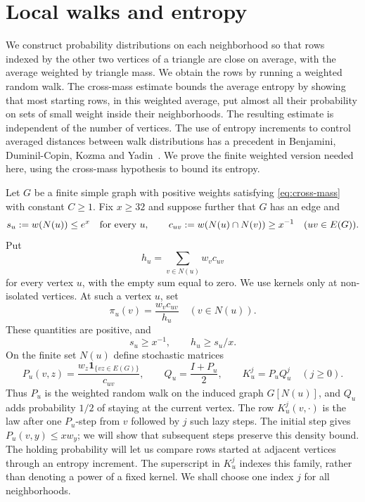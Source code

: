 \documentclass[11pt]{article}
\theoremstyle{definition}
\theoremstyle{remark}
\numberwithin{equation}{section}
\begin{document}
\section{Local walks and entropy}
\label{sec:entropy}

We construct probability distributions on each neighborhood so that rows
indexed by the other two vertices of a triangle are close on average,
with the average weighted by triangle mass.  We obtain the rows by running
a weighted random walk.  The cross-mass estimate bounds the average entropy
by showing that most starting rows, in this weighted average, put almost
all their probability on sets of small weight inside their neighborhoods.
The resulting estimate is independent of the number of vertices.
The use of entropy increments to control averaged distances between
walk distributions has a precedent in Benjamini, Duminil-Copin, Kozma
and Yadin~\cite[Section~2]{BDKY2015}.
We prove the finite weighted version needed here, using the cross-mass
hypothesis to bound its entropy.

Let $G$ be a finite simple graph with positive weights satisfying
\eqref{eq:cross-mass} with constant $C\ge1$.
Fix $x\ge32$ and suppose further that $G$ has an edge and
\begin{equation}
 s_u:=w(N(u))\le e^x\quad\hbox{for every $u$},\qquad
 c_{uv}:=w(N(u)\cap N(v))\ge x^{-1}\quad(uv\in E(G)).
 \label{eq:walk-hypotheses}
\end{equation}
Put
\[
 h_u=\sum_{v\in N(u)}w_vc_{uv}
\]
for every vertex $u$, with the empty sum equal to zero.  We use kernels
only at non-isolated vertices.  At such a vertex $u$, set
\[
 \pi_u(v)=\frac{w_vc_{uv}}{h_u}\quad(v\in N(u)).
\]
These quantities are positive, and
\begin{equation}
 s_u\ge x^{-1},\qquad h_u\ge s_u/x.
 \label{eq:walk-lower-bounds}
\end{equation}
On the finite set $N(u)$ define stochastic matrices
\begin{equation}
 P_u(v,z)=\frac{w_z\mathbf1_{\{vz\in E(G)\}}}{c_{uv}},\qquad
 Q_u=\frac{I+P_u}{2},\qquad K_u^j=P_uQ_u^j\quad(j\ge0).
 \label{eq:walk-kernels}
\end{equation}
Thus $P_u$ is the weighted random walk on the induced graph $G[N(u)]$,
and $Q_u$ adds probability $1/2$ of staying at the current vertex.
The row $K_u^j(v,\cdot)$ is the law after one $P_u$-step from $v$ followed
by $j$ such lazy steps.  The initial step gives
$P_u(v,y)\le xw_y$; we will show that subsequent steps preserve this
density bound.  The holding probability will let us compare rows started
at adjacent vertices through an entropy increment.
The superscript in $K_u^j$ indexes this family, rather than denoting a
power of a fixed kernel.  We shall choose one index $j$ for all neighborhoods.
\end{document}
